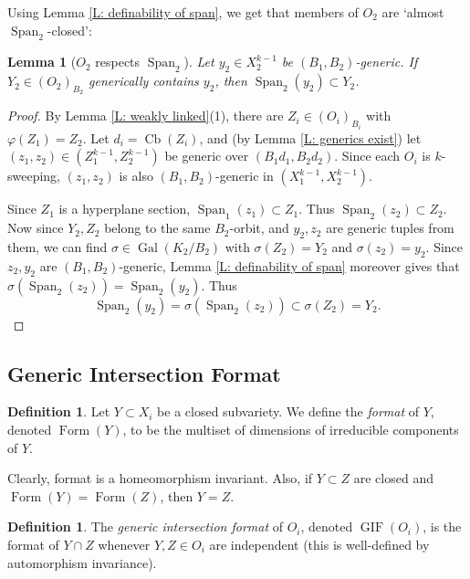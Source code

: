 \documentclass{amsart}
\newtheorem{lemma}[theorem]{Lemma}
\theoremstyle{definition}
\newtheorem{definition}[theorem]{Definition}
\begin{document}
    Using Lemma \ref{L: definability of span}, we get that members of $O_2$ are `almost $\operatorname{Span}_2$-closed':

    \begin{lemma}[$O_2$ respects $\operatorname{Span}_2$]\label{L: O_2 is affine closed}
        Let $y_2\in X_2^{k-1}$ be $(B_1,B_2)$-generic. If $Y_2\in(O_2)_{B_2}$ generically contains $y_2$, then $\operatorname{Span}_2(y_2)\subset Y_2$.
    \end{lemma}
    \begin{proof}
        By Lemma \ref{L: weakly linked}(1), there are $Z_i\in(O_i)_{B_i}$ with $\varphi(Z_1)=Z_2$. Let $d_i=\operatorname{Cb}(Z_i)$, and (by Lemma \ref{L: generics exist}) let $(z_1,z_2)\in(Z_1^{k-1},Z_2^{k-1})$ be generic over $(B_1d_1,B_2d_2)$. Since each $O_i$ is $k$-sweeping, $(z_1,z_2)$ is also $(B_1,B_2)$-generic in $(X_1^{k-1},X_2^{k-1})$.

        Since $Z_1$ is a hyperplane section, $\operatorname{Span}_1(z_1)\subset Z_1$. Thus $\operatorname{Span}_2(z_2)\subset Z_2$. Now since $Y_2,Z_2$ belong to the same $B_2$-orbit, and $y_2,z_2$ are generic tuples from them, we can find $\sigma\in\operatorname{Gal}(K_2/B_2)$ with $\sigma(Z_2)=Y_2$ and $\sigma(z_2)=y_2$. Since $z_2,y_2$ are $(B_1,B_2)$-generic, Lemma \ref{L: definability of span} moreover gives that $\sigma(\operatorname{Span}_2(z_2))=\operatorname{Span}_2(y_2)$. Thus $$\operatorname{Span}_2(y_2)=\sigma(\operatorname{Span}_2(z_2))\subset\sigma(Z_2)=Y_2.$$
    \end{proof}

    \subsection{Generic Intersection Format}

    \begin{definition}
        Let $Y\subset X_i$ be a closed subvariety. We define the \textit{format} of $Y$, denoted $\operatorname{Form}(Y)$, to be the multiset of dimensions of irreducible components of $Y$.
    \end{definition}

    Clearly, format is a homeomorphism invariant. Also, if $Y\subset Z$ are closed and $\operatorname{Form}(Y)=\operatorname{Form}(Z)$, then $Y=Z$.

    \begin{definition}
        The \textit{generic intersection format} of $O_i$, denoted $\operatorname{GIF}(O_i)$, is the format of $Y\cap Z$ whenever $Y,Z\in O_i$ are independent (this is well-defined by automorphism invariance).
    \end{definition}
    
\end{document}
